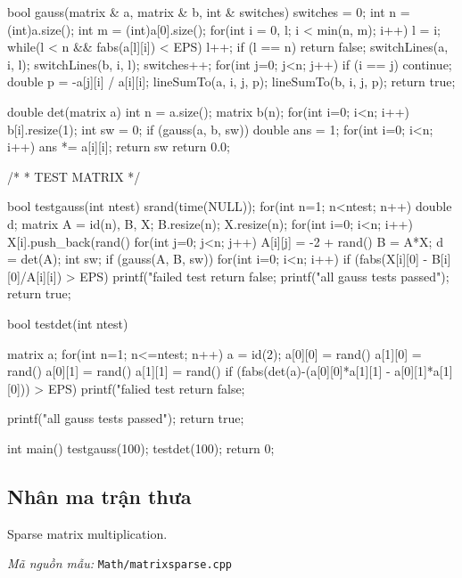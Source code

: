 \documentclass[11pt]{article}
\newcommand{\codepath}[1]{\par\noindent\textit{Mã nguồn mẫu:} \texttt{#1}\par}
\begin{document}
\begin{vncode}
bool gauss(matrix & a, matrix & b, int & switches) {
	switches = 0;
	int n = (int)a.size();
	int m = (int)a[0].size();
	for(int i = 0, l; i < min(n, m); i++) {
		l = i;
		while(l < n && fabs(a[l][i]) < EPS) l++;
		if (l == n) return false;
		switchLines(a, i, l);
		switchLines(b, i, l);
		switches++;
		for(int j=0; j<n; j++) {
			if (i == j) continue;
			double p = -a[j][i] / a[i][i];
			lineSumTo(a, i, j, p);
			lineSumTo(b, i, j, p);
		}
	}
	return true;
}

double det(matrix a) {
	int n = a.size();
	matrix b(n);
	for(int i=0; i<n; i++) b[i].resize(1);
	int sw = 0;
	if (gauss(a, b, sw)) {
		double ans = 1;
		for(int i=0; i<n; i++) ans *= a[i][i];
		return sw %
	}
	return 0.0;
}

/*
 * TEST MATRIX
 */

bool testgauss(int ntest) {
	srand(time(NULL));
	for(int n=1; n<ntest; n++) {
		double d;
		matrix A = id(n), B, X;
		B.resize(n);
		X.resize(n);
		for(int i=0; i<n; i++) {
			X[i].push_back(rand()%
			for(int j=0; j<n; j++) {
				A[i][j] = -2 + rand()%
			}
		}
		B = A*X;
		d = det(A);
		int sw;
		if (gauss(A, B, sw)) {
			for(int i=0; i<n; i++) {
				if (fabs(X[i][0] - B[i][0]/A[i][i]) > EPS) {
					printf("failed test %
					return false;
				}
			}
		}
	}
	printf("all gauss tests passed\n");
	return true;
}

bool testdet(int ntest) {
	matrix a;
	for(int n=1; n<=ntest; n++) {
		a = id(2);
		a[0][0] = rand()%
		a[1][0] = rand()%
		a[0][1] = rand()%
		a[1][1] = rand()%
		if (fabs(det(a)-(a[0][0]*a[1][1] - a[0][1]*a[1][0])) > EPS) {
			printf("falied test  %
			return false;
		}
	}
	
	printf("all gauss tests passed\n");
	return true;
}

int main() {
	testgauss(100);
	testdet(100);
	return 0;
}
\end{vncode}
\endgroup


\subsection{Nhân ma trận thưa}

Sparse matrix multiplication.

\codepath{Math/matrixsparse.cpp}
\end{document}
